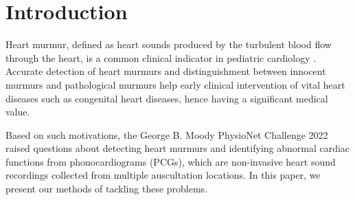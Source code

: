 \section{Introduction}
\label{sec:intro}

Heart murmur, defined as heart sounds produced by the turbulent blood flow through the heart, is a common clinical indicator in pediatric cardiology \cite{Masic_2018}. Accurate detection of heart murmurs and distinguishment between innocent murmurs and pathological murmurs help early clinical intervention of vital heart diseases such as congenital heart diseases, hence having a significant medical value.

Based on such motivations, the George B. Moody PhysioNet Challenge 2022 \cite{goldberger2000physionet,cinc2022} raised questions about detecting heart murmurs and identifying abnormal cardiac functions from phonocardiograms (PCGs), which are non-invasive heart sound recordings collected from multiple auscultation locations. In this paper, we present our methods of tackling these problems.
